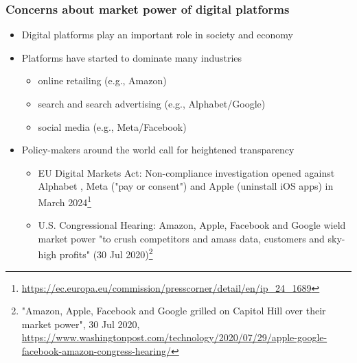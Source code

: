 \documentclass[8pt]{beamer}
\begin{document}
\begin{frame}[label=shortversion]

\frametitle{Concerns about market power of digital platforms}

\begin{itemize}

	\item Digital platforms play an important role in society and economy 

	\item Platforms have started to dominate many industries 
		\begin{itemize}
		\item online retailing (e.g., Amazon)
		\item search and search advertising (e.g., Alphabet/Google)
		\item social media (e.g., Meta/Facebook)

	\end{itemize}
	
	\item Policy-makers around the world call for heightened transparency %
		\begin{itemize}
		\item EU Digital Markets Act: Non-compliance investigation opened against Alphabet \citep[self-preferencing in search; ][]{self_preferencing_skiera}, Meta ("pay or consent") and Apple (uninstall iOS apps) in March 2024\footnote{\url{https://ec.europa.eu/commission/presscorner/detail/en/ip_24_1689}} 
		
		\item U.S. Congressional Hearing: Amazon, Apple, Facebook and Google wield market power "to crush competitors and amass data, customers and sky-high profits" (30 Jul 2020)\footnote{"Amazon, Apple, Facebook and Google grilled on Capitol Hill over their market power", 30 Jul 2020, \url{https://www.washingtonpost.com/technology/2020/07/29/apple-google-facebook-amazon-congress-hearing/}}
	\end{itemize}	
	
	
\end{itemize}
	

\end{frame}
\end{document}
